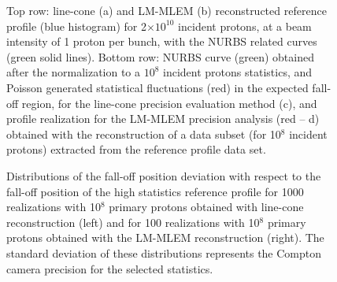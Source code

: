 \begin{figure}
\caption{Top row: line-cone (a) and LM-MLEM (b) reconstructed reference profile (blue histogram) for 2$\times10^{10}$ incident protons, at a beam intensity of 1 proton per bunch, with the NURBS related curves (green solid lines). Bottom row: NURBS curve (green) obtained after the normalization to a $10^8$ incident protons statistics, and Poisson generated statistical fluctuations (red) in the expected fall-off region, for the line-cone precision evaluation method (c), and profile realization for the LM-MLEM precision analysis (red -- d) obtained with the reconstruction of a data subset (for 10$^{8}$ incident protons) extracted from the reference profile data set.}
\end{figure}

\begin{figure}
  \centering
  \caption{Distributions of the fall-off position deviation with respect to the fall-off position of the high statistics reference profile for 1000 realizations with 10$^8$ primary protons obtained with line-cone reconstruction (left) and for 100 realizations with 10$^8$ primary protons obtained with the LM-MLEM reconstruction (right). The standard deviation of these distributions represents the Compton camera precision for the selected statistics.}
\end{figure}

